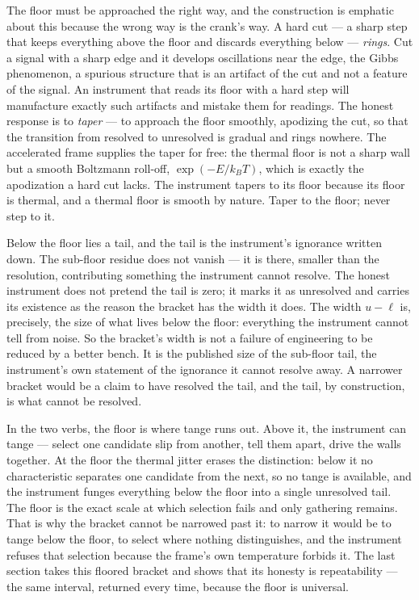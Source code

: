 The floor must be approached the right way, and the construction is emphatic about this because the wrong way is the crank's
way. A hard cut --- a sharp step that keeps everything above the floor and discards everything below --- \emph{rings}. Cut a
signal with a sharp edge and it develops oscillations near the edge, the Gibbs phenomenon, a spurious structure that is an
artifact of the cut and not a feature of the signal. An instrument that reads its floor with a hard step will manufacture
exactly such artifacts and mistake them for readings. The honest response is to \emph{taper} --- to approach the floor
smoothly, apodizing the cut, so that the transition from resolved to unresolved is gradual and rings nowhere. The accelerated
frame supplies the taper for free: the thermal floor is not a sharp wall but a smooth Boltzmann roll-off, $\exp(-E / k_B T)$,
which is exactly the apodization a hard cut lacks. The instrument tapers to its floor because its floor is thermal, and a
thermal floor is smooth by nature. Taper to the floor; never step to it.

Below the floor lies a tail, and the tail is the instrument's ignorance written down. The sub-floor residue does not vanish
--- it is there, smaller than the resolution, contributing something the instrument cannot resolve. The honest instrument
does not pretend the tail is zero; it marks it as unresolved and carries its existence as the reason the bracket has the
width it does. The width $u - \ell$ is, precisely, the size of what lives below the floor: everything the instrument cannot
tell from noise. So the bracket's width is not a failure of engineering to be reduced by a better bench. It is the published
size of the sub-floor tail, the instrument's own statement of the ignorance it cannot resolve away. A narrower bracket would
be a claim to have resolved the tail, and the tail, by construction, is what cannot be resolved.

In the two verbs, the floor is where tange runs out. Above it, the instrument can tange --- select one candidate slip from
another, tell them apart, drive the walls together. At the floor the thermal jitter erases the distinction: below it no
characteristic separates one candidate from the next, so no tange is available, and the instrument funges everything below
the floor into a single unresolved tail. The floor is the exact scale at which selection fails and only gathering remains.
That is why the bracket cannot be narrowed past it: to narrow it would be to tange below the floor, to select where nothing
distinguishes, and the instrument refuses that selection because the frame's own temperature forbids it. The last section
takes this floored bracket and shows that its honesty is repeatability --- the same interval, returned every time, because
the floor is universal.

